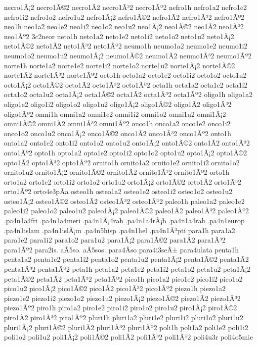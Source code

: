 {necro1Ã¡2 necro1Ã©2 necro1Ã­2 necro1Ã³2 necro1Ãº2
nefro1h
nefro1a2 nefro1e2 nefro1i2 nefro1o2 nefro1u2
nefro1Ã¡2 nefro1Ã©2 nefro1Ã­2 nefro1Ã³2 nefro1Ãº2
neo1h
neo1a2 neo1e2 neo1i2 neo1o2 neo1u2
neo1Ã¡2 neo1Ã©2 neo1Ã­2 neo1Ã³2 neo1Ãº2
3c2neor
neto1h
neto1a2 neto1e2 neto1i2 neto1o2 neto1u2
neto1Ã¡2 neto1Ã©2 neto1Ã­2 neto1Ã³2 neto1Ãº2
neumo1h
neumo1a2 neumo1e2 neumo1i2 neumo1o2 neumo1u2
neumo1Ã¡2 neumo1Ã©2 neumo1Ã­2 neumo1Ã³2 neumo1Ãº2
norte1h
norte1a2 norte1e2 norte1i2 norte1o2 norte1u2
norte1Ã¡2 norte1Ã©2 norte1Ã­2 norte1Ã³2 norte1Ãº2
octo1h
octo1a2 octo1e2 octo1i2 octo1o2 octo1u2
octo1Ã¡2 octo1Ã©2 octo1Ã­2 octo1Ã³2 octo1Ãº2
octa1h
octa1a2 octa1e2 octa1i2 octa1o2 octa1u2
octa1Ã¡2 octa1Ã©2 octa1Ã­2 octa1Ã³2 octa1Ãº2
oligo1h
oligo1a2 oligo1e2 oligo1i2 oligo1o2 oligo1u2
oligo1Ã¡2 oligo1Ã©2 oligo1Ã­2 oligo1Ã³2 oligo1Ãº2
omni1h
omni1a2 omni1e2 omni1i2 omni1o2 omni1u2
omni1Ã¡2 omni1Ã©2 omni1Ã­2 omni1Ã³2 omni1Ãº2
onco1h
onco1a2 onco1e2 onco1i2 onco1o2 onco1u2
onco1Ã¡2 onco1Ã©2 onco1Ã­2 onco1Ã³2 onco1Ãº2
onto1h
onto1a2 onto1e2 onto1i2 onto1o2 onto1u2
onto1Ã¡2 onto1Ã©2 onto1Ã­2 onto1Ã³2 onto1Ãº2
opto1h
opto1a2 opto1e2 opto1i2 opto1o2 opto1u2
opto1Ã¡2 opto1Ã©2 opto1Ã­2 opto1Ã³2 opto1Ãº2
ornito1h
ornito1a2 ornito1e2 ornito1i2 ornito1o2 ornito1u2
ornito1Ã¡2 ornito1Ã©2 ornito1Ã­2 ornito1Ã³2 ornito1Ãº2
orto1h
orto1a2 orto1e2 orto1i2 orto1o2 orto1u2
orto1Ã¡2 orto1Ã©2 orto1Ã­2 orto1Ã³2 orto1Ãº2
orto4e3pÃ­a
osteo1h
osteo1a2 osteo1e2 osteo1i2 osteo1o2 osteo1u2
osteo1Ã¡2 osteo1Ã©2 osteo1Ã­2 osteo1Ã³2 osteo1Ãº2
paleo1h
paleo1a2 paleo1e2 paleo1i2 paleo1o2 paleo1u2
paleo1Ã¡2 paleo1Ã©2 paleo1Ã­2 paleo1Ã³2 paleo1Ãº2
.pa4n1a4fri
.pa4n1a4meri
.pa4n1Ã¡4rab
.pa4n1a4rÃ¡b
.pa4n1a4rab
.pa4n1europ
.pa4n1islam
.pa4n1islÃ¡m
.pa4n5hisp
.pa4n1hel
.pa4n1Ã³pti
para1h
para1a2 para1e2 para1i2 para1o2 para1u2
para1Ã¡2 para1Ã©2 para1Ã­2 para1Ã³2 para1Ãº2
para2is.
aÃ­5so.
aÃ­5sos.
para4Ã­so
para4i3seÃ±
para4ulata
penta1h
penta1a2 penta1e2 penta1i2 penta1o2 penta1u2
penta1Ã¡2 penta1Ã©2 penta1Ã­2 penta1Ã³2 penta1Ãº2
peta1h
peta1a2 peta1e2 peta1i2 peta1o2 peta1u2
peta1Ã¡2 peta1Ã©2 peta1Ã­2 peta1Ã³2 peta1Ãº2
pico1h
pico1a2 pico1e2 pico1i2 pico1o2 pico1u2
pico1Ã¡2 pico1Ã©2 pico1Ã­2 pico1Ã³2 pico1Ãº2
piezo1h
piezo1a2 piezo1e2 piezo1i2 piezo1o2 piezo1u2
piezo1Ã¡2 piezo1Ã©2 piezo1Ã­2 piezo1Ã³2 piezo1Ãº2
piro1h
piro1a2 piro1e2 piro1i2 piro1o2 piro1u2
piro1Ã¡2 piro1Ã©2 piro1Ã­2 piro1Ã³2 piro1Ãº2
pluri1h
pluri1a2 pluri1e2 pluri1i2 pluri1o2 pluri1u2
pluri1Ã¡2 pluri1Ã©2 pluri1Ã­2 pluri1Ã³2 pluri1Ãº2
poli1h
poli1a2 poli1e2 poli1i2 poli1o2 poli1u2
poli1Ã¡2 poli1Ã©2 poli1Ã­2 poli1Ã³2 poli1Ãº2
poli4u3r
poli4o5mie
}
